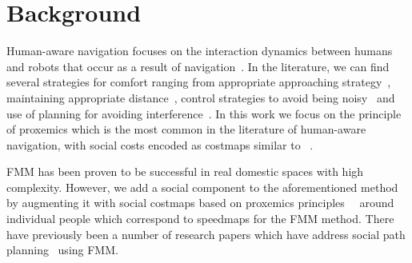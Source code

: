 \section{Background}
\label{Literature}


Human-aware navigation focuses on the interaction dynamics between humans and robots that occur as a result of navigation~\cite{Kruse2013}. 
In the literature, we can find several strategies for comfort ranging from appropriate approaching strategy~\cite{Dautenhahn2006}, maintaining appropriate distance~\cite{Takayama2009}, control strategies to avoid being noisy~\cite{Martinson2007} and use of planning for avoiding interference~\cite{Vasquez2012}. In this work we focus on the principle of proxemics which is the most common in the literature of human-aware navigation, with social costs encoded as costmaps similar to ~\cite{gomez2013social}.


FMM has been proven to be successful in real domestic spaces with high complexity\cite{ventura2015}. However, we add a social component to the aforementioned method by augmenting it with social costmaps \textemdash based on proxemics principles~\cite{kirby2009companion}\textemdash~ around individual people which correspond to speedmaps for the FMM method. %
There have previously been a number of research papers which have address social path planning~\cite{gomez2014fast,gomez2013social} using FMM. %

